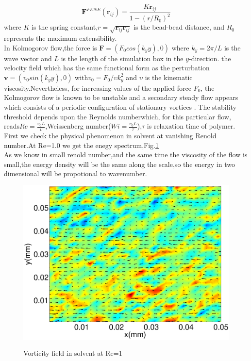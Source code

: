 \documentclass[aps,prl,twocolumn,showpacs,superscriptaddress,groupedaddress]{revtex4}  %
\begin{document}
\begin{equation}\label{equ:fene}
 \mathbf{F}^{FENE}(\mathbf{r}_{ij})=\frac{K\mathbf{r}_{ij}}{1-(r/R_0)^2}
\end{equation}
where $K$ is the spring constant,$r=\sqrt{\mathbf{r}_{ij}\mathbf{r}_{ij}}$ is the bead-bead
distance, and $R_0$ represents the maximum extensibility.\\
In Kolmogorov flow,the force is  $\mathbf{F}=(F_0cos(k_yy),0)$
where $k_y= 2\pi/L$ is the wave vector and $L$ is the length of the simulation box in the $y$-direction. the velocity field which
has the same functional form as the perturbation $\mathbf{v}=(v_0sin(k_yy),0)$
with$ v_0=F_0/\upsilon k_{y}^{2}$ and $\upsilon$ is the kinematic viscosity.Nevertheless, for increasing values of the applied force $F_0$,
the Kolmogorov flow is known to be unstable and a secondary steady flow appears which consists of a periodic configuration of stationary vortices \cite{posch97}.
The stability threshold depends upon the Reynolds numberwhich, for this particular flow, reads$Re=\frac{v_0L}{\upsilon}$,Weissenberg number($Wi=\frac{v_0L}{\tau}$),$\tau$ is 
relaxation time of polymer.
First we check the physical phenomenon in solvent at vanishing Renold number.At Re=1.0
we get the enegy spectrum,Fig.\ref{fig:spesols}\\As we know in small renold number,and the same time the viscosity of the flow is small,the energy density will be the same 
along the scale,so the energy in two dimensional will be propotional to wavenumber.
\begin{figure}
 \includegraphics[scale=0.5]{vorsols}
\label{fig:spesols}
\caption{Vorticity field in solvent at Re=1}
\end{figure} \\
\end{document}
